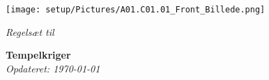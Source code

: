 \documentclass[11pt,a4paper,openright]{report}
\begin{document}
	\begin{titlepage}
	    \begin{center}
	        \texttt{[image: setup/Pictures/A01.C01.01\_Front\_Billede.png]}
		
	        \vspace{0.5cm}
	        \LARGE
	        \textit{Regelsæt til}
		
	        \vspace{4.5cm}
	        \Huge
	        \textbf{Tempelkriger}\\
	        \vspace{4.5cm}
	        \large
	        \textit{Opdateret: \today}
		\end{center}
	\end{titlepage}
	
	\pagestyle{plain} %
	\renewcommand*\contentsname{Indholdsfortegnelse}
	\tableofcontents
	
	
	
	
	
	
	
	
	
\end{document}
